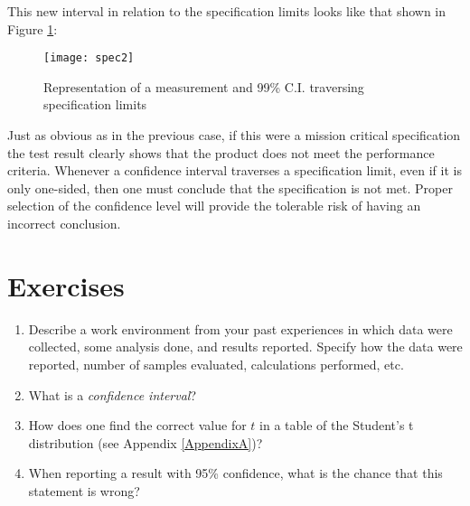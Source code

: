 This new interval in relation to the specification limits looks like that shown in Figure \ref{SpecLim}:

\begin{figure}[h]\caption{Representation of a measurement and 99\% C.I. traversing specification limits}\label{SpecLim}
\begin{center}
\texttt{[image: spec2]}
\end{center}
\end{figure}

Just as obvious as in the previous case, if this were a mission critical specification the test result clearly shows that the product does not meet the performance criteria.  Whenever a confidence interval traverses a specification limit, even if it is only one-sided, then one must conclude that the specification is not met.  Proper selection of the confidence level will provide the tolerable risk of having an incorrect conclusion.  
\newpage
\section{Exercises}
\begin{enumerate}
\item Describe a work environment from your past experiences in which data were collected, some analysis done, and results reported.  Specify how the data were reported, number of samples evaluated, calculations performed, etc.

\item What is a \textit{confidence interval}?

\item How does one find the correct value for $ t $ in a table of the Student's t distribution (see Appendix \ref{AppendixA})?

\item When reporting a result with 95\% confidence, what is the chance that this statement is wrong?
\end{enumerate}
